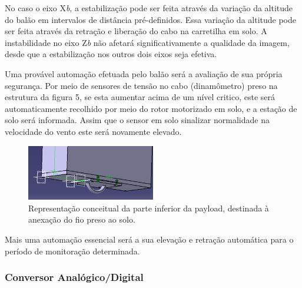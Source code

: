 	No caso o eixo X\textit{b}, a estabilização pode ser feita através da variação da altitude do balão em intervalos de distância pré-definidos. Essa variação da altitude pode ser feita através da retração e liberação do cabo na carretilha em solo. A instabilidade no eixo Z\textit{b} não afetará significativamente a qualidade da imagem, desde que a estabilização nos outros dois eixos seja efetiva.

	Uma provável automação efetuada pelo balão será a avaliação de sua própria segurança. Por meio de sensores de tensão no cabo (dinamômetro) preso na estrutura da figura 5, se esta aumentar acima de um nível critico, este será automaticamente recolhido por meio do rotor motorizado em solo, e a estação de solo será informada. Assim que o sensor em solo sinalizar normalidade na velocidade do vento este será novamente elevado.

	\begin{figure}[H]
		\centering
		\includegraphics[width=0.5\textwidth]{figuras/parteInferior}
		\caption{Representação conceitual da parte inferior da payload, destinada à anexação do fio preso ao solo.}
		\label{img:parteInferior}
	\end{figure}

	Mais uma automação essencial será a sua elevação e retração automática para o período de monitoração determinada.

\subsubsection{Conversor Analógico/Digital}

